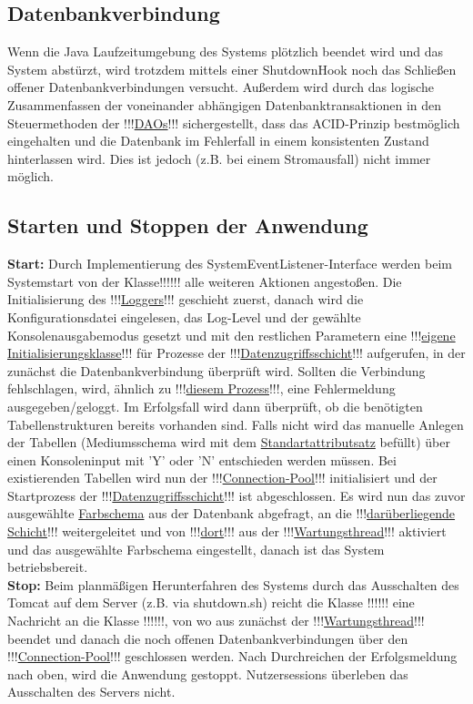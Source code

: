 \documentclass{article}
\begin{document}
\subsection{Datenbankverbindung}
Wenn die Java Laufzeitumgebung des Systems plötzlich beendet wird und das System abstürzt, wird trotzdem mittels einer ShutdownHook noch das Schließen offener Datenbankverbindungen versucht. Außerdem wird durch das logische Zusammenfassen der voneinander abhängigen Datenbanktransaktionen in den Steuermethoden der !!!\hyperlink{}{DAOs}!!! sichergestellt, dass das ACID-Prinzip bestmöglich eingehalten und die Datenbank im Fehlerfall in einem konsistenten Zustand hinterlassen wird. Dies ist jedoch (z.B. bei einem Stromausfall) nicht immer möglich.
\subsection{Starten und Stoppen der Anwendung}
\noindent \textbf{Start:} Durch Implementierung des SystemEventListener-Interface werden beim Systemstart von der Klasse!!!\hyperlink{}{}!!! alle weiteren Aktionen angestoßen. Die Initialisierung des !!!\hyperlink{}{Loggers}!!! geschieht zuerst, danach wird die Konfigurationsdatei eingelesen, das Log-Level und der gewählte Konsolenausgabemodus gesetzt und mit den restlichen Parametern eine !!!\hyperlink{}{eigene Initialisierungsklasse}!!! für Prozesse der !!!\hyperlink{}{Datenzugriffsschicht}!!! aufgerufen, in der zunächst die Datenbankverbindung überprüft wird. Sollten die Verbindung fehlschlagen, wird, ähnlich zu !!!\hyperlink{}{diesem Prozess}!!!, eine Fehlermeldung ausgegeben/geloggt. Im Erfolgsfall wird dann überprüft, ob die benötigten Tabellenstrukturen bereits vorhanden sind. Falls nicht wird das manuelle Anlegen der Tabellen (Mediumsschema wird mit dem \hyperlink{Standartattributsatz}{Standartattributsatz} befüllt) über einen Konsoleninput mit 'Y' oder 'N' entschieden werden müssen. Bei existierenden Tabellen wird  nun der !!!\hyperlink{}{Connection-Pool}!!! initialisiert und der Startprozess der !!!\hyperlink{}{Datenzugriffsschicht}!!! ist abgeschlossen. Es wird nun das zuvor ausgewählte \hyperlink{Farbschemaattribut}{Farbschema} aus der Datenbank abgefragt, an die !!!\hyperlink{}{darüberliegende Schicht}!!! weitergeleitet und von !!!\hyperlink{}{dort}!!! aus der !!!\hyperlink{}{Wartungsthread}!!! aktiviert und das ausgewählte Farbschema eingestellt, danach ist das System betriebsbereit. \\
\textbf{Stop:} 
Beim planmäßigen Herunterfahren des Systems durch das Ausschalten des Tomcat auf dem Server (z.B. via shutdown.sh) reicht die Klasse !!!\hyperlink{}{}!!! eine Nachricht an die Klasse !!!\hyperlink{}{}!!!, von wo aus zunächst der !!!\hyperlink{}{Wartungsthread}!!! beendet und danach die noch offenen Datenbankverbindungen über den !!!\hyperlink{}{Connection-Pool}!!! geschlossen werden. Nach Durchreichen der Erfolgsmeldung nach oben, wird die Anwendung gestoppt. Nutzersessions überleben das Ausschalten des Servers nicht.
\end{document}
